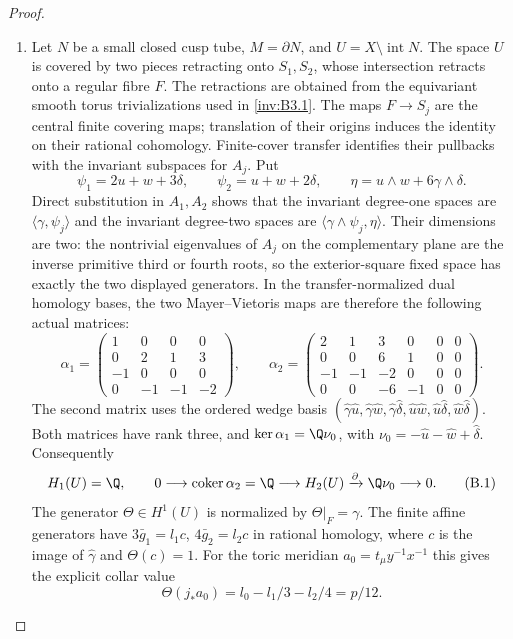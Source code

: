 \begin{proof}
\begin{enumerate}[label=\arabic*.,leftmargin=*]
\item Let $N$ be a small closed cusp tube, $M=\partial N$, and
$U=X\setminus\operatorname{int}N$. The space $U$ is covered by
two pieces retracting onto $S_1,S_2$, whose intersection retracts
onto a regular fibre $F$. The retractions are obtained from the
equivariant smooth torus trivializations used in \ref{inv:B3.1}. The maps
$F\to S_j$ are the central finite covering maps; translation of
their origins induces the identity on their rational cohomology.
Finite-cover transfer identifies their pullbacks with the invariant
subspaces for $A_j$. Put
\[
 \psi_1=2u+w+3\delta,\qquad \psi_2=u+w+2\delta,
 \qquad \eta=u\wedge w+6\gamma\wedge\delta.
\]
Direct substitution in $A_1,A_2$ shows that the invariant
degree-one spaces are $\langle\gamma,\psi_j\rangle$ and the
invariant degree-two spaces are
$\langle\gamma\wedge\psi_j,\eta\rangle$.
Their dimensions are two: the nontrivial eigenvalues of $A_j$ on
the complementary plane are the inverse primitive third or fourth
roots, so the exterior-square fixed space has exactly the two
displayed generators.
In the transfer-normalized dual homology bases, the two
Mayer--Vietoris maps are therefore the following actual matrices:
\[
 \alpha_1=\begin{pmatrix}
 1&0&0&0\\0&2&1&3\\-1&0&0&0\\0&-1&-1&-2
 \end{pmatrix},\qquad
 \alpha_2=\begin{pmatrix}
 2&1&3&0&0&0\\0&0&6&1&0&0\\
 -1&-1&-2&0&0&0\\0&0&-6&-1&0&0
 \end{pmatrix}.
\]
The second matrix uses the ordered wedge basis
$(\hat\gamma\hat u,\hat\gamma\hat w,\hat\gamma\hat\delta,
\hat u\hat w,\hat u\hat\delta,\hat w\hat\delta)$.
Both matrices have rank three, and
$\ker\alpha_1=\Q\nu_0$, with
$\nu_0=-\hat u-\hat w+\hat\delta$.
Consequently
\[
 H_1(U)=\Q,\qquad
 0\longrightarrow\operatorname{coker}\alpha_2=\Q
 \longrightarrow H_2(U)
 \xrightarrow{\partial}\Q\nu_0\longrightarrow0.       \tag{B.1}
\]
The generator $\Theta\in H^1(U)$ is normalized by
$\Theta|_F=\gamma$. The finite affine generators have
$3\bar g_1=l_1c$, $4\bar g_2=l_2c$ in rational homology, where
$c$ is the image of $\hat\gamma$ and $\Theta(c)=1$.
For the toric meridian $a_0=t_\mu y^{-1}x^{-1}$ this gives the
explicit collar value
\[
 \Theta(j_*a_0)=l_0-l_1/3-l_2/4=p/12.                 \tag{B.2}
\]


\end{enumerate}
\end{proof}
